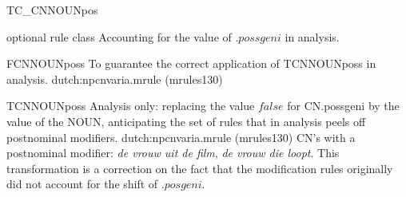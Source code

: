 \begin{mruleclass}{TC\_CNNOUNpos}
\begin{classdescr}
\kind optional rule class
\classtask Accounting for the value of $.possgeni$ in analysis.
\classremarks
\begin{filters}
\begin{member}
 FCNNOUNposs
 To guarantee the correct application of TCNNOUNposs in analysis.
\file dutch:npcnvaria.mrule (mrules130)
\end{member}
\end{filters}
\nospeedrules
\noplannedrules
\norulesnotince
\begin{comments}
\end{comments}

\end{classdescr}
\begin{members}
\begin{member}
 TCNNOUNposs
 Analysis only: replacing the value $false$ 
for CN.possgeni by 
the value of the NOUN, anticipating the set of rules that in analysis 
peels off postnominal modifiers. 
\file dutch:npcnvaria.mrule (mrules130)
\semantics \nosemantics
\example CN's with a postnominal modifier:
{\em de vrouw uit de film}, {\em de vrouw die loopt}.
\remarks This transformation is a correction on the fact that the modification 
rules originally did not account for the shift of .$posgeni$.
\end{member}

\end{members}

\end{mruleclass}

